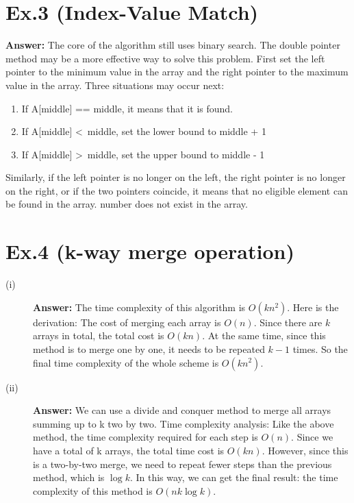 \documentclass{article}
\begin{document}
\section*{Ex.3 (Index-Value Match)}
    \textbf{Answer:} The core of the algorithm still uses binary search. The double pointer method may be a more effective way to solve this problem. First set the left pointer to the minimum value in the array and the right pointer to the maximum value in the array. Three situations may occur next:
    \begin{enumerate}
        \item If A[middle] == middle, it means that it is found.
        \item If A[middle] \textless\ middle, set the lower bound to middle + 1
        \item If A[middle] \textgreater\ middle, set the upper bound to middle - 1
    \end{enumerate}
    Similarly, if the left pointer is no longer on the left, the right pointer is no longer on the right, or if the two pointers coincide, it means that no eligible element can be found in the array. number does not exist in the array.
\section*{Ex.4 (k-way merge operation)}
    \begin{description}
        \item[(i)]\textbf{Answer:} The time complexity of this algorithm is $O(kn^2)$. Here is the derivation: The cost of merging each array is $O(n)$. Since there are $k$ arrays in total, the total cost is $O(kn)$. At the same time, since this method is to merge one by one, it needs to be repeated $k-1$ times. So the final time complexity of the whole scheme is $O(kn^2)$.
        \item[(ii)]\textbf{Answer:} We can use a divide and conquer method to merge all arrays summing up to k two by two. Time complexity analysis: Like the above method, the time complexity required for each step is $O(n)$. Since we have a total of k arrays, the total time cost is $O(kn)$. However, since this is a two-by-two merge, we need to repeat fewer steps than the previous method, which is $\log k$. In this way, we can get the final result: the time complexity of this method is $O(nk \log k)$.
    \end{description}
\end{document}
